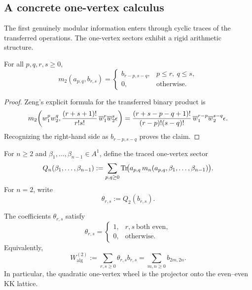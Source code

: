\subsection{A concrete one-vertex calculus}

The first genuinely modular information enters through cyclic traces of the transferred
operations. The one-vertex sectors exhibit a rigid arithmetic structure.

\begin{proposition}
For all $p,q,r,s\ge 0$,
\[
m_2(a_{p,q},b_{r,s})=
\begin{cases}
 b_{r-p,s-q},& p\le r,\ q\le s,\\[4pt]
 0,& \text{otherwise.}
\end{cases}
\]
\end{proposition}

\begin{proof}
Zeng's explicit formula for the transferred binary product is
\[
m_2\!\left(w_1^p w_2^q,
\frac{(r+s+1)!}{r!s!}\,\overline{w}_1^r \overline{w}_2^s\epsilon\right)
=
\frac{(r+s-p-q+1)!}{(r-p)!(s-q)!}\,\overline{w}_1^{r-p}\overline{w}_2^{s-q}\epsilon.
\]
Recognizing the right-hand side as $b_{r-p,s-q}$ proves the claim.
\end{proof}

\begin{definition}
For $n\ge 2$ and $\beta_1,\dots,\beta_{n-1}\in A^1$, define the traced one-vertex sector
\begin{equation}
Q_n(\beta_1,\dots,\beta_{n-1})
:=
\sum_{p,q\ge 0}
\operatorname{Tr}\!\bigl(a_{p,q}\,m_n(a_{p,q},\beta_1,\dots,\beta_{n-1})\bigr).
\end{equation}
For $n=2$, write
\[
\theta_{r,s}:=Q_2(b_{r,s}).
\]
\end{definition}

\begin{theorem}
The coefficients $\theta_{r,s}$ satisfy
\[
\theta_{r,s}=
\begin{cases}
1,& r,s\ \text{both even},\\
0,& \text{otherwise}.
\end{cases}
\]
Equivalently,
\[
W^{(2)}_{\mathrm{alg}}:=\sum_{r,s\ge 0}\theta_{r,s}b_{r,s}
=\sum_{m,n\ge 0} b_{2m,2n}.
\]
In particular, the quadratic one-vertex wheel is the projector onto the even--even KK lattice.
\end{theorem}

